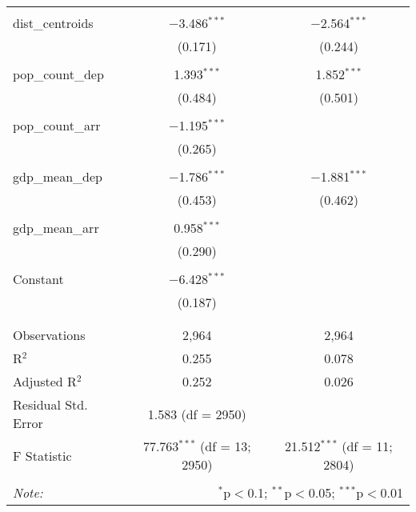 \begin{table}[!htbp]
\begin{tabular}{@{\extracolsep{5pt}}lcc}
  & & \\ 
 dist\_centroids & $-$3.486$^{***}$ & $-$2.564$^{***}$ \\ 
  & (0.171) & (0.244) \\ 
  & & \\ 
 pop\_count\_dep & 1.393$^{***}$ & 1.852$^{***}$ \\ 
  & (0.484) & (0.501) \\ 
  & & \\ 
 pop\_count\_arr & $-$1.195$^{***}$ &  \\ 
  & (0.265) &  \\ 
  & & \\ 
 gdp\_mean\_dep & $-$1.786$^{***}$ & $-$1.881$^{***}$ \\ 
  & (0.453) & (0.462) \\ 
  & & \\ 
 gdp\_mean\_arr & 0.958$^{***}$ &  \\ 
  & (0.290) &  \\ 
  & & \\ 
 Constant & $-$6.428$^{***}$ &  \\ 
  & (0.187) &  \\ 
  & & \\ 
\hline \\[-1.8ex] 
Observations & 2,964 & 2,964 \\ 
R$^{2}$ & 0.255 & 0.078 \\ 
Adjusted R$^{2}$ & 0.252 & 0.026 \\ 
Residual Std. Error & 1.583 (df = 2950) &  \\ 
F Statistic & 77.763$^{***}$ (df = 13; 2950) & 21.512$^{***}$ (df = 11; 2804) \\ 
\hline 
\hline \\[-1.8ex] 
\textit{Note:}  & \multicolumn{2}{r}{$^{*}$p$<$0.1; $^{**}$p$<$0.05; $^{***}$p$<$0.01} \\ 
\end{tabular} 
\end{table} 
